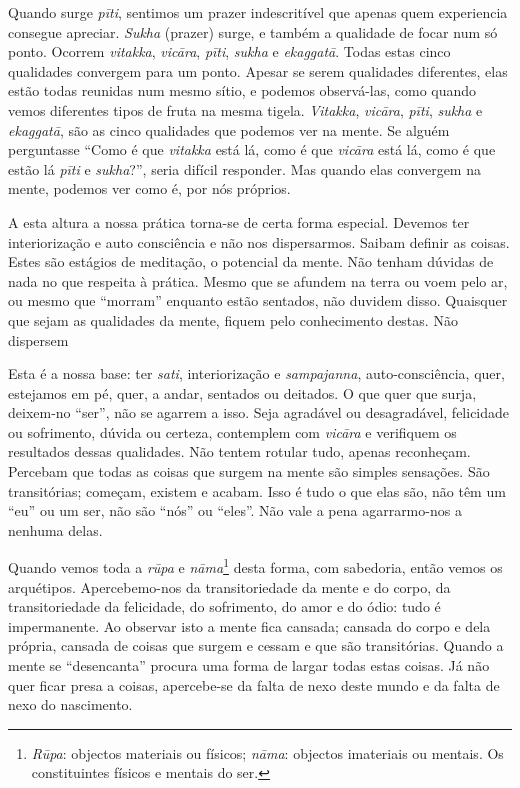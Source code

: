 Quando surge \emph{pīti}, sentimos um prazer indescritível que apenas
quem experiencia consegue apreciar. \emph{Sukha} (prazer) surge, e
também a qualidade de focar num só ponto. Ocorrem \emph{vitakka},
\emph{vicāra}, \emph{pīti}, \emph{sukha} e \emph{ekaggatā}. Todas estas
cinco qualidades convergem para um ponto. Apesar se serem qualidades
diferentes, elas estão todas reunidas num mesmo sítio, e podemos
observá-las, como quando vemos diferentes tipos de fruta na mesma
tigela. \emph{Vitakka}, \emph{vicāra}, \emph{pīti}, \emph{sukha} e
\emph{ekaggatā}, são as cinco qualidades que podemos ver na mente. Se
alguém perguntasse ``Como é que \emph{vitakka} está lá, como é que
\emph{vicāra} está lá, como é que estão lá \emph{pīti} e
\emph{sukha}?'', seria difícil responder. Mas quando elas convergem na
mente, podemos ver como é, por nós próprios.

A esta altura a nossa prática torna-se de certa forma especial. Devemos
ter interiorização e auto consciência e não nos dispersarmos. Saibam
definir as coisas. Estes são estágios de meditação, o potencial da
mente. Não tenham dúvidas de nada no que respeita à prática. Mesmo que
se afundem na terra ou voem pelo ar, ou mesmo que ``morram'' enquanto
estão sentados, não duvidem disso. Quaisquer que sejam as qualidades da
mente, fiquem pelo conhecimento destas. Não dispersem

Esta é a nossa base: ter \emph{sati}, interiorização e
\emph{sampajanna}, auto-consciência, quer, estejamos em pé, quer, a
andar, sentados ou deitados. O que quer que surja, deixem-no ``ser'',
não se agarrem a isso. Seja agradável ou desagradável, felicidade ou
sofrimento, dúvida ou certeza, contemplem com \emph{vicāra} e verifiquem
os resultados dessas qualidades. Não tentem rotular tudo, apenas
reconheçam. Percebam que todas as coisas que surgem na mente são simples
sensações. São transitórias; começam, existem e acabam. Isso é tudo o
que elas são, não têm um ``eu'' ou um ser, não são ``nós'' ou ``eles''.
Não vale a pena agarrarmo-nos a nenhuma delas.

Quando vemos toda a \emph{rūpa} e \emph{nāma}\footnote{%
  \emph{Rūpa}: objectos materiais ou físicos; \emph{nāma}: objectos
  imateriais ou mentais. Os constituintes físicos e mentais do ser.
}
desta forma, com
sabedoria, então vemos os arquétipos. Apercebemo-nos da transitoriedade
da mente e do corpo, da transitoriedade da felicidade, do sofrimento, do
amor e do ódio: tudo é impermanente. Ao observar isto a mente fica
cansada; cansada do corpo e dela própria, cansada de coisas que surgem e
cessam e que são transitórias. Quando a mente se ``desencanta'' procura
uma forma de largar todas estas coisas. Já não quer ficar presa a
coisas, apercebe-se da falta de nexo deste mundo e da falta de nexo do
nascimento.


